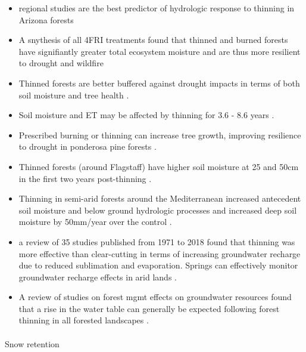 \documentclass[
  number]{elsarticle}
\makeatletter
\let\oldparagraph\paragraph
\renewcommand{\paragraph}{
    \@ifstar
      \xxxParagraphStar
      \xxxParagraphNoStar
  }
\newcommand{\xxxParagraphStar}[1]{\oldparagraph*{#1}\mbox{}}
\newcommand{\xxxParagraphNoStar}[1]{\oldparagraph{#1}\mbox{}}
\makeatother
\begin{document}
\begin{itemize}
\item
  regional studies are the best predictor of hydrologic response to
  thinning in Arizona forests \citep{wyatt_estimating_2013}
\item
  A snythesis of all 4FRI treatments found that thinned and burned
  forests have signifiantly greater total ecosystem moisture and are
  thus more resilient to drought and wildfire
  \citep{sankey_regionalscale_2021}
\item
  Thinned forests are better buffered against drought impacts in terms
  of both soil moisture and tree health \citep{sankey_thinning_2022}.
\item
  Soil moisture and ET may be affected by thinning for 3.6 - 8.6 years
  \citep{del_campo_global_2022}.
\item
  Prescribed burning or thinning can increase tree growth, improving
  resilience to drought in ponderosa pine forests \citep{rodman2024}.
\item
  Thinned forests (around Flagstaff) have higher soil moisture at 25 and
  50cm in the first two years post-thinning \citep{belmonte_soil_2022}.
\item
  Thinning in semi-arid forests around the Mediterranean increased
  antecedent soil moisture and below ground hydrologic processes and
  increased deep soil moisture by 50mm/year over the control
  \citep{del_campo_effectiveness_2019}.
\item
  a review of 35 studies published from 1971 to 2018 found that thinning
  was more effective than clear-cutting in terms of increasing
  groundwater recharge due to reduced sublimation and evaporation.
  Springs can effectively monitor groundwater recharge effects in arid
  lands \citep{schenk_impacts_2020}.
\item
  A review of studies on forest mgmt effects on groundwater resources
  found that a rise in the water table can generally be expected
  following forest thinning in all forested landscapes
  \citep{smerdon_overview_2009}.
\end{itemize}

\paragraph{Snow retention}\label{snow-retention}
\end{document}
